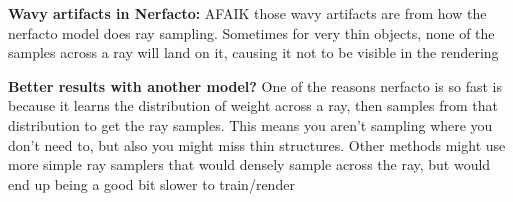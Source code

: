 \textbf{Wavy artifacts in Nerfacto:}
AFAIK those wavy artifacts are from how the nerfacto model does ray sampling. Sometimes for very thin objects, none of the samples across a ray will land on it, causing it not to be visible in the rendering 

\textbf{Better results with another model?}
One of the reasons nerfacto is so fast is because it learns the distribution of weight across a ray, then samples from that distribution to get the ray samples. This means you aren't sampling where you don't need to, but also you might miss thin structures. Other methods might use more simple ray samplers that would densely sample across the ray, but would end up being a good bit slower to train/render
